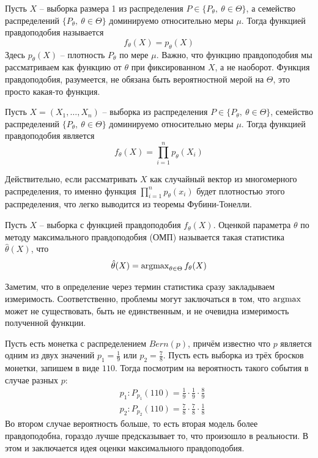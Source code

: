 \begin{definition}
     Пусть $X$ -- выборка размера 1 из распределения $P \in \{P_\theta,\ \theta \in \Theta\}$, а семейство распределений $\{P_\theta,\ \theta \in \Theta\}$ доминируемо относительно меры $\mu$. Тогда функцией правдоподобия называется
     \[
        f_\theta(X) = p_\theta(X)
     \]
     Здесь $p_\theta(X)$ -- плотность $P_\theta$ по мере $\mu$. Важно, что функцию правдоподобия мы рассматриваем как функцию от $\theta$ при фиксированном $X$, а не наоборот. Функция правдоподобия, разумеется, не обязана быть вероятностной мерой на $\Theta$, это просто какая-то функция.
\end{definition}

\begin{example}
    Пусть $X = (X_1, \dots, X_n)$ -- выборка из распределения $P \in \{P_\theta,\ \theta \in \Theta\}$, семейство распределений $\{P_\theta,\ \theta \in \Theta\}$ доминируемо относительно меры $\mu$. Тогда функцией правдоподобия является
    \[
        f_\theta(X) = \prod_{i=1}^n p_\theta(X_i)
    \]

    Действительно, если рассматривать $X$ как случайный вектор из многомерного распределения, то именно функция $\prod_{i=1}^n p_\theta(x_i)$ будет плотностью этого распределения, что легко выводится из теоремы Фубини-Тонелли.
\end{example}

\begin{definition}
    Пусть $X$ -- выборка с функцией правдоподобия $f_\theta(X)$. Оценкой параметра $\theta$ по методу максимального правдоподобия (ОМП) называется такая статистика $\hat{\theta}(X)$, что
    \[
        \hat{\theta}(X) = \operatorname{argmax}_{\theta \in \Theta} f_\theta(X)
    \]
\end{definition}

\begin{note}
    Заметим, что в определение через термин статистика сразу закладываем измеримость. Соответственно, проблемы могут заключаться в том, что $\operatorname{argmax}$ может не существовать, быть не единственным, и не очевидна измеримость полученной функции.
\end{note}

\begin{example}
    Пусть есть монетка с распределением $Bern(p)$, причём известно что $p$ является одним из двух значений $p_1 = \frac{1}{9}$ или $p_2 = \frac{7}{8}$. Пусть есть выборка из трёх бросков монетки, запишем в виде $110$. Тогда посмотрим на вероятность такого события в случае разных $p$:
    \begin{align*}
        & p_1 \colon P_{p_1}(110) = \frac{1}{9} \cdot \frac{1}{9} \cdot \frac{8}{9}
        \\
        & p_2 \colon P_{p_2}(110) = \frac{7}{8} \cdot \frac{7}{8} \cdot \frac{1}{8}
    \end{align*}
    Во втором случае вероятность больше, то есть вторая модель более правдоподобна, гораздо лучше предсказывает то, что произошло в реальности. В этом и заключается идея оценки максимального правдоподобия.
\end{example}


